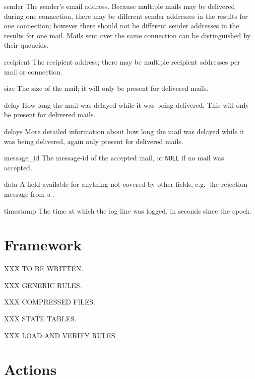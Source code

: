 \begin{boldeqlist}
    \item [sender] The sender's email address.  Because multiple mails may
        be delivered during one connection, there may be different sender
        addresses in the results for one connection; however there should
        not be different sender addresses in the results for one mail.
        Mails sent over the same connection can be distinguished by their
        queueids.

    \item [recipient] The recipient address; there may be multiple
        recipient addresses per mail or connection.

    \item [size] The size of the mail; it will only be present for
        delivered mails.

    \item [delay] How long the mail was delayed while it was being
        delivered.  This will only be present for delivered mails.

    \item [delays] More detailed information about how long the mail was
        delayed while it was being delivered, again only present for
        delivered mails.

    \item [message\_id] The message-id of the accepted mail, or
        \texttt{NULL} if no mail was accepted.

    \item [data] A field available for anything not covered by other
        fields, e.g.\ the rejection message from a \@.

    \item [timestamp] The time at which the log line was logged, in seconds
        since the epoch.

\end{boldeqlist}



\section{Framework}

XXX TO BE WRITTEN\@.

XXX GENERIC RULES\@.

XXX COMPRESSED FILES\@.

XXX STATE TABLES\@.

XXX LOAD AND VERIFY RULES\@.

\section{Actions}


